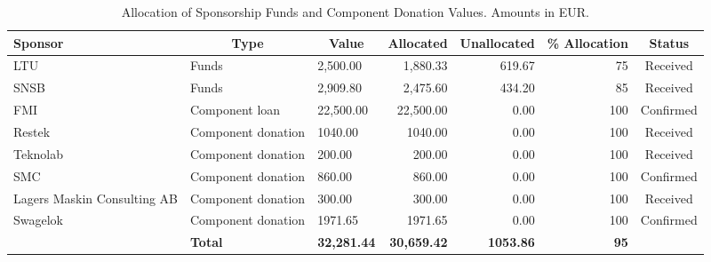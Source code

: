 \begin{table}[H]
\centering
\begin{tabular}{l|m{}|l|r|r|r|c}
\hline
\multicolumn{1}{|l|}{\textbf{Sponsor}} & \multicolumn{1}{|c|}{\textbf{Type}} & \multicolumn{1}{c|}{\textbf{Value}} & \multicolumn{1}{c|}{\textbf{Allocated}} & \multicolumn{1}{c|}{\textbf{Unallocated}} & \multicolumn{1}{c|}{\textbf{\% Allocation}} & \multicolumn{1}{c|}{\textbf{Status}} \\ \hline
\multicolumn{1}{|l|}{LTU} & Funds & 2,500.00 & 1,880.33 & 619.67 & 75 & \multicolumn{1}{c|}{Received} \\ \hline
\multicolumn{1}{|l|}{SNSB} & Funds & 2,909.80 & 2,475.60 & 434.20 & 85 & \multicolumn{1}{c|}{Received} \\ \hline
\multicolumn{1}{|l|}{FMI} & Component loan & 22,500.00 & 22,500.00 & 0.00 & 100 & \multicolumn{1}{c|}{Confirmed} \\ \hline
\multicolumn{1}{|l|}{Restek} & Component donation & 1040.00 & 1040.00 & 0.00 & 100 & \multicolumn{1}{c|}{Received} \\ \hline
\multicolumn{1}{|l|}{Teknolab} & Component donation & 200.00 & 200.00 & 0.00 & 100 & \multicolumn{1}{c|}{Received} \\ \hline
\multicolumn{1}{|l|}{SMC} & Component donation & 860.00 & 860.00 & 0.00 & 100 & \multicolumn{1}{c|}{Confirmed} \\ \hline
\multicolumn{1}{|l|}{Lagers Maskin Consulting AB} & Component donation & 300.00 & 300.00 & 0.00 & 100 & \multicolumn{1}{c|}{Received} \\ \hline
\multicolumn{1}{|l|}{Swagelok} & Component donation & 1971.65 & 1971.65 & 0.00 & 100 & \multicolumn{1}{c|}{Confirmed} \\ \hline
 & \multicolumn{1}{l|}{\textbf{Total}} & \textbf{32,281.44} & \textbf{30,659.42} & \textbf{1053.86} & \textbf{95} & \multicolumn{1}{l}{} \\ \cline{2-6}
\end{tabular}
\caption{Allocation of Sponsorship Funds and Component Donation Values. Amounts in EUR.}
\label{table:sponsroship-allocation}
\end{table}